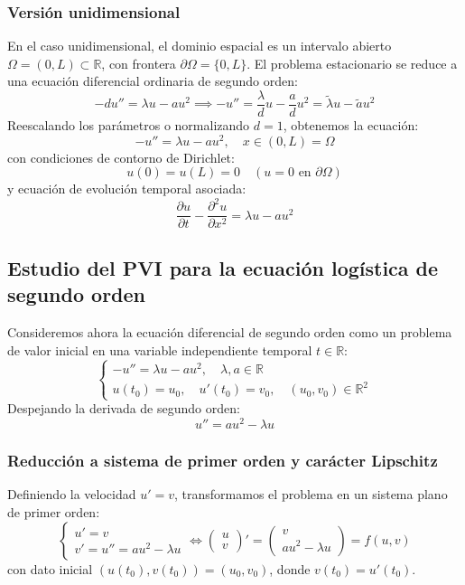 \subsubsection{Versión unidimensional}

En el caso unidimensional, el dominio espacial es un intervalo abierto $\Omega = (0, L) \subset \mathbb{R}$, con frontera $\partial \Omega = \{0, L\}$. El problema estacionario se reduce a una ecuación diferencial ordinaria de segundo orden:
\[
    -d u'' = \lambda u - a u^2 \implies -u'' = \frac{\lambda}{d} u - \frac{a}{d} u^2 = \tilde{\lambda} u - \tilde{a} u^2
\]
Reescalando los parámetros o normalizando $d = 1$, obtenemos la ecuación:
\[
    \boxed{-u'' = \lambda u - a u^2, \quad x \in (0, L) = \Omega}
\]
con condiciones de contorno de Dirichlet:
\[
    u(0) = u(L) = 0 \quad (u = 0 \text{ en } \partial \Omega)
\]
y ecuación de evolución temporal asociada:
\[
    \frac{\partial u}{\partial t} - \frac{\partial^2 u}{\partial x^2} = \lambda u - a u^2
\]

\subsection{Estudio del PVI para la ecuación logística de segundo orden}

Consideremos ahora la ecuación diferencial de segundo orden como un problema de valor inicial en una variable independiente temporal $t \in \mathbb{R}$:
\[
    \begin{cases}
        -u'' = \lambda u - a u^2, \quad \lambda, a \in \mathbb{R} \\
        u(t_0) = u_0, \quad u'(t_0) = v_0, \quad (u_0, v_0) \in \mathbb{R}^2
    \end{cases}
\]
Despejando la derivada de segundo orden:
\[
    u'' = a u^2 - \lambda u
\]

\subsubsection{Reducción a sistema de primer orden y carácter Lipschitz}

Definiendo la velocidad $u' = v$, transformamos el problema en un sistema plano de primer orden:
\[
    \begin{cases}
        u' = v \\
        v' = u'' = a u^2 - \lambda u
    \end{cases}
    \iff
    \begin{pmatrix} u \\ v \end{pmatrix}' =
    \begin{pmatrix} v \\ a u^2 - \lambda u \end{pmatrix} = f(u, v)
\]
con dato inicial $(u(t_0), v(t_0)) = (u_0, v_0)$, donde $v(t_0) = u'(t_0)$.

